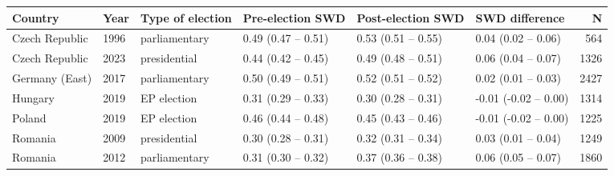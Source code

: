 
\begin{tabular}{l|l|l|l|l|l|r}
\hline
Country & Year & Type of election & Pre-election SWD & Post-election SWD & SWD difference & N\\
\hline
Czech Republic & 1996 & parliamentary & 0.49 (0.47 – 0.51) & 0.53 (0.51 – 0.55) & 0.04 (0.02 – 0.06) & 564\\
\hline
Czech Republic & 2023 & presidential & 0.44 (0.42 – 0.45) & 0.49 (0.48 – 0.51) & 0.06 (0.04 – 0.07) & 1326\\
\hline
Germany (East) & 2017 & parliamentary & 0.50 (0.49 – 0.51) & 0.52 (0.51 – 0.52) & 0.02 (0.01 – 0.03) & 2427\\
\hline
Hungary & 2019 & EP election & 0.31 (0.29 – 0.33) & 0.30 (0.28 – 0.31) & -0.01 (-0.02 – 0.00) & 1314\\
\hline
Poland & 2019 & EP election & 0.46 (0.44 – 0.48) & 0.45 (0.43 – 0.46) & -0.01 (-0.02 – 0.00) & 1225\\
\hline
Romania & 2009 & presidential & 0.30 (0.28 – 0.31) & 0.32 (0.31 – 0.34) & 0.03 (0.01 – 0.04) & 1249\\
\hline
Romania & 2012 & parliamentary & 0.31 (0.30 – 0.32) & 0.37 (0.36 – 0.38) & 0.06 (0.05 – 0.07) & 1860\\
\hline
\end{tabular}
